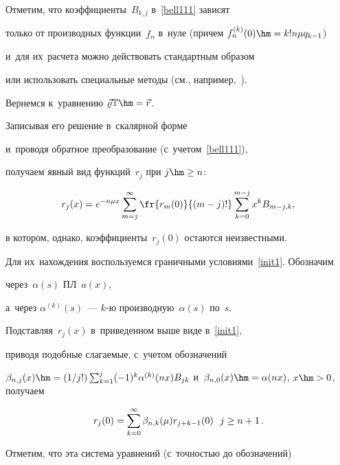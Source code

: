 Отметим, что коэффициенты~$B_{k,j}$ в~\eqref{bell111} зависят

только от производных функции~$f_n$ в~нуле (причем ${f_n^{(k)}(0)\hm= k!n\mu q_{k-1}}$) 

и~для их~расчета можно действовать стандартным образом~\cite[с. 61]{bell0} 

или использовать специальные методы  (см., например,~\cite{bell11,bell2}).



Вернемся к~уравнению ${\vec \varrho}  \mathbb{T}\hm={\vec r}$.

Записывая его решение в~скалярной форме

и~проводя обратное преобразование (с~учетом~\eqref{bell111}),

получаем явный вид функций~$r_j$ при ${j \hm\ge n}$:

\begin{equation}

\label{so0}

r_j(x) = e^{- n \mu x} \sum\limits_{m=j}^{\infty} \fr{r_m(0)}{(m-j)!}

\sum\limits_{k=0}^{m-j} x^k  B_{m-j,k},

\end{equation}

в котором, однако, коэффициенты~${r_j(0)}$ остаются неизвестными.

Для их~нахождения воспользуемся граничными условиями~\eqref{init1}. Обозначим

через~$\alpha(s)$ ПЛ~$a(x)$,

а~через $\alpha^{(k)}(s)$~--- $k$-ю производную~$\alpha(s)$ по~${s}$.

Подставляя~$r_j(x)$ в~приведенном выше виде в~\eqref{init1},

приводя подобные сла\-га\-емые, с~учетом обозначений

${\beta_{n,j}(x)\hm=(1/j!)\sum\nolimits_{k=1}^{j}  (-1)^k \alpha^{(k)}(n x)

B_{jk}}$ и~${\beta_{n,0}(x)\hm=\alpha(n x)}$, ${x\hm >0}$, получаем

\begin{equation}

r_j(0) =

\sum\limits_{k=0}^{\infty} \beta_{n,k}(\mu) r_{j+k-1}(0) \, \enskip  j \ge n+1\,.

\label{so1}

\end{equation}

Отметим, что эта система уравнений (с~точ\-ностью до обозначений)

